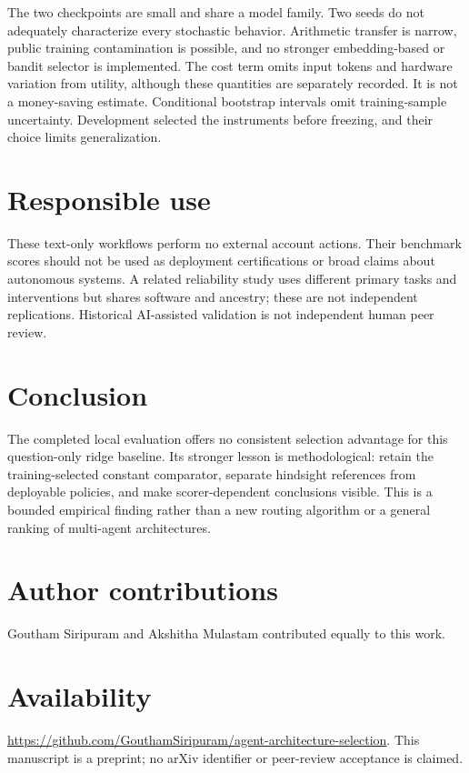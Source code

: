 \documentclass[10pt]{article}
\begin{document}
The two checkpoints are small and share a model family. Two seeds do not adequately characterize every stochastic behavior. Arithmetic transfer is narrow, public training contamination is possible, and no stronger embedding-based or bandit selector is implemented. The cost term omits input tokens and hardware variation from utility, although these quantities are separately recorded. It is not a money-saving estimate. Conditional bootstrap intervals omit training-sample uncertainty. Development selected the instruments before freezing, and their choice limits generalization.

\section{Responsible use}
These text-only workflows perform no external account actions. Their benchmark scores should not be used as deployment certifications or broad claims about autonomous systems. A related reliability study uses different primary tasks and interventions but shares software and ancestry; these are not independent replications. Historical AI-assisted validation is not independent human peer review.

\section{Conclusion}
The completed local evaluation offers no consistent selection advantage for this question-only ridge baseline. Its stronger lesson is methodological: retain the training-selected constant comparator, separate hindsight references from deployable policies, and make scorer-dependent conclusions visible. This is a bounded empirical finding rather than a new routing algorithm or a general ranking of multi-agent architectures.
\section*{Author contributions}Goutham Siripuram and Akshitha Mulastam contributed equally to this work.\section*{Availability}\url{https://github.com/GouthamSiripuram/agent-architecture-selection}. This manuscript is a preprint; no arXiv identifier or peer-review acceptance is claimed.


\end{document}
